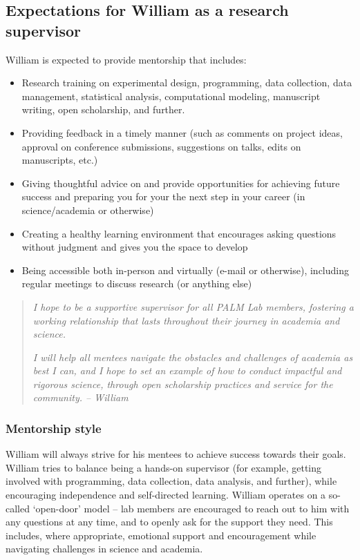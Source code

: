 \documentclass[
]{book}
\providecommand{\tightlist}{%
  \setlength{\itemsep}{0pt}\setlength{\parskip}{0pt}}
\begin{document}
\hypertarget{will-mentor}{%
\subsection{Expectations for William as a research supervisor}\label{will-mentor}}

William is expected to provide mentorship that includes:

\begin{itemize}
\tightlist
\item
  Research training on experimental design, programming, data collection, data management, statistical analysis, computational modeling, manuscript writing, open scholarship, and further.
\item
  Providing feedback in a timely manner (such as comments on project ideas, approval on conference submissions, suggestions on talks, edits on manuscripts, etc.)
\item
  Giving thoughtful advice on and provide opportunities for achieving future success and preparing you for your the next step in your career (in science/academia or otherwise)
\item
  Creating a healthy learning environment that encourages asking questions without judgment and gives you the space to develop
\item
  Being accessible both in-person and virtually (e-mail or otherwise), including regular meetings to discuss research (or anything else)
\end{itemize}

\begin{quote}
\emph{I hope to be a supportive supervisor for all PALM Lab members, fostering a working relationship that lasts throughout their journey in academia and science.}

\emph{I will help all mentees navigate the obstacles and challenges of academia as best I can, and I hope to set an example of how to conduct impactful and rigorous science, through open scholarship practices and service for the community. -- William}
\end{quote}

\hypertarget{mentorship-style}{%
\subsubsection*{Mentorship style}\label{mentorship-style}}

William will always strive for his mentees to achieve success towards their goals. William tries to balance being a hands-on supervisor (for example, getting involved with programming, data collection, data analysis, and further), while encouraging independence and self-directed learning. William operates on a so-called `open-door' model -- lab members are encouraged to reach out to him with any questions at any time, and to openly ask for the support they need. This includes, where appropriate, emotional support and encouragement while navigating challenges in science and academia.
\end{document}
